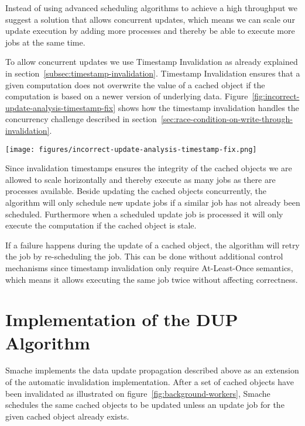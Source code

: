 Instead of using advanced scheduling algorithms to achieve a high throughput we suggest a solution that allows concurrent updates, which means we can scale our update execution by adding more processes and thereby be able to execute more jobs at the same time.

To allow concurrent updates we use Timestamp Invalidation as already explained in section~\ref{subsec:timestamp-invalidation}. Timestamp Invalidation ensures that a given computation does not overwrite the value of a cached object if the computation is based on a newer version of underlying data. Figure~\ref{fig:incorrect-update-analysis-timestamp-fix} shows how the timestamp invalidation handles the concurrency challenge described in section~\ref{sec:race-condition-on-write-through-invalidation}.

\begin{figure*}[ht!]
  \centering
  \texttt{[image: figures/incorrect-update-analysis-timestamp-fix.png]}
  \caption{How Invalidation Timestamps fixes the concurrency problem described in figure~\ref{fig:incorrect-updates-analysis}.}
  \label{fig:incorrect-update-analysis-timestamp-fix}
\end{figure*}

Since invalidation timestamps ensures the integrity of the cached objects we are allowed to scale horizontally and thereby execute as many jobs as there are processes available. Beside updating the cached objects concurrently, the algorithm will only schedule new update jobs if a similar job has not already been scheduled. Furthermore when a scheduled update job is processed it will only execute the computation if the cached object is stale.

If a failure happens during the update of a cached object, the algorithm will retry the job by re-scheduling the job. This can be done without additional control mechanisms since timestamp invalidation only require At-Least-Once semantics, which means it allows executing the same job twice without affecting correctness.


\section{Implementation of the DUP Algorithm}
\label{sec:implementing-the-data-updata-propagation-algorithm}

Smache implements the data update propagation described above as an extension of the automatic invalidation implementation. After a set of cached objects have been invalidated as illustrated on figure~\ref{fig:background-workers}, Smache schedules the same cached objects to be updated unless an update job for the given cached object already exists.

